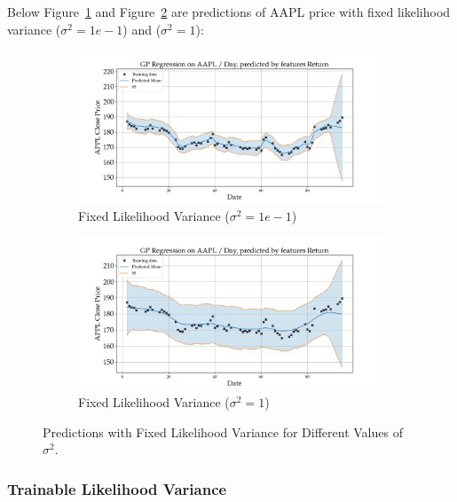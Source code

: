 Below Figure~\ref{fig:variance_fixed_1e-1} and Figure~\ref{fig:variance_fixed_1} are predictions of AAPL price with fixed likelihood variance ($\sigma^2 = 1e-1$) and ($\sigma^2 = 1$):
\begin{figure}[htbp]
    \centering
    \begin{subfigure}[b]{0.45\textwidth}
        \centering
        \includegraphics[width=\textwidth]{figures/variance=1e1.png}
        \caption{Fixed Likelihood Variance ($\sigma^2 = 1e-1$)}
        \label{fig:variance_fixed_1e-1}
    \end{subfigure}
    \hfill
    \begin{subfigure}[b]{0.45\textwidth}
        \centering
        \includegraphics[width=\textwidth]{figures/variance=1.png}
        \caption{Fixed Likelihood Variance ($\sigma^2 = 1$)}
        \label{fig:variance_fixed_1}
    \end{subfigure}
    \caption{Predictions with Fixed Likelihood Variance for Different Values of $\sigma^2$.}
    \label{fig:variance_fixed_comparison}
\end{figure}


\subsubsection{Trainable Likelihood Variance}

